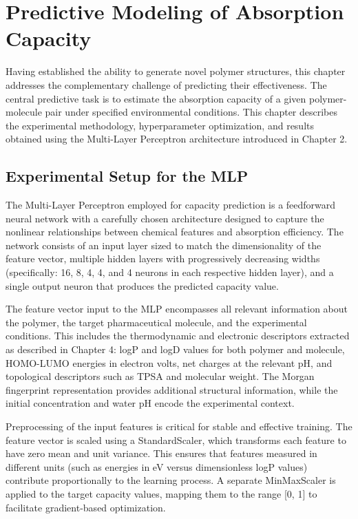 \chapter{Predictive Modeling of Absorption Capacity}
\label{sec:predictive_chapter}

Having established the ability to generate novel polymer structures, this chapter addresses the complementary challenge of predicting their effectiveness. The central predictive task is to estimate the absorption capacity of a given polymer-molecule pair under specified environmental conditions. This chapter describes the experimental methodology, hyperparameter optimization, and results obtained using the Multi-Layer Perceptron architecture introduced in Chapter 2.

\section{Experimental Setup for the MLP}
\label{sec:mlp_setup}

The Multi-Layer Perceptron employed for capacity prediction is a feedforward neural network with a carefully chosen architecture designed to capture the nonlinear relationships between chemical features and absorption efficiency. The network consists of an input layer sized to match the dimensionality of the feature vector, multiple hidden layers with progressively decreasing widths (specifically: 16, 8, 4, 4, and 4 neurons in each respective hidden layer), and a single output neuron that produces the predicted capacity value.

The feature vector input to the MLP encompasses all relevant information about the polymer, the target pharmaceutical molecule, and the experimental conditions. This includes the thermodynamic and electronic descriptors extracted as described in Chapter 4: logP and logD values for both polymer and molecule, HOMO-LUMO energies in electron volts, net charges at the relevant pH, and topological descriptors such as TPSA and molecular weight. The Morgan fingerprint representation provides additional structural information, while the initial concentration and water pH encode the experimental context.

Preprocessing of the input features is critical for stable and effective training. The feature vector is scaled using a StandardScaler, which transforms each feature to have zero mean and unit variance. This ensures that features measured in different units (such as energies in eV versus dimensionless logP values) contribute proportionally to the learning process. A separate MinMaxScaler is applied to the target capacity values, mapping them to the range [0, 1] to facilitate gradient-based optimization.

